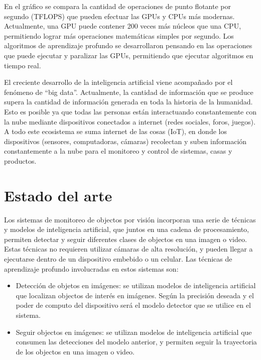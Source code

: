 
En el gráfico se compara la cantidad de operaciones de punto flotante por segundo (TFLOPS) \citep{TFLOPS} que pueden efectuar las GPUs y CPUs más modernas. Actualmente, una GPU puede contener 200 veces más núcleos que una CPU, permitiendo lograr más operaciones matemáticas simples por segundo. Los algoritmos de aprendizaje profundo se desarrollaron pensando en las operaciones que puede ejecutar y paralizar las GPUs, permitiendo que ejecutar algoritmos en tiempo real.

El creciente desarrollo de la inteligencia artificial viene acompañado por el fenómeno de ``big data''. Actualmente, la cantidad de información que se produce supera la cantidad de información generada en toda la historia de la humanidad. Esto es posible ya que todas las personas están interactuando constantemente con la nube mediante dispositivos conectados a internet (redes sociales, foros, juegos). A todo este ecosistema se suma internet de las cosas (IoT), en donde los dispositivos (sensores, computadoras, cámaras) recolectan y suben información constantemente a la nube para el monitoreo y control de sistemas, casas y productos.

\newpage


\section{Estado del arte}
\label{sec:estadoDelArte}

Los sistemas de monitoreo de objectos por visión incorporan una serie de técnicas y modelos de inteligencia artificial, que juntos en una cadena de procesamiento, permiten detectar y seguir diferentes clases de objectos en una imagen o video. Estas técnicas no requieren utilizar cámaras de alta resolución, y pueden llegar a ejecutarse dentro de un dispositivo embebido o un celular. Las técnicas de aprendizaje profundo involucradas en estos sistemas son:

\begin{itemize}
\item Detección de objetos en imágenes: se utilizan modelos de inteligencia artificial que localizan objectos de interés en imágenes. Según la precisión deseada y el poder de computo del dispositivo será el modelo detector que se utilice en el sistema.
\item Seguir objectos en imágenes: se utilizan modelos de inteligencia artificial que consumen las detecciones del modelo anterior, y permiten seguir la trayectoria de los objectos en una imagen o video.
\end{itemize}

